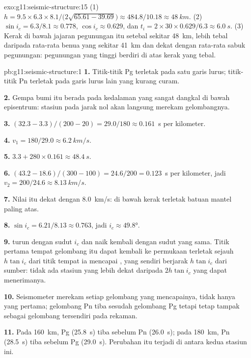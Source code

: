 \begin{solution}{exo:g11:seismic-structure:15}
(1) $h = 9.5 \times 6.3 \times 8.1/\bigl(2\sqrt{65.61 - 39.69}\bigr) \approx
484.8/10.18 \approx \qty{48}{km}$. (2) $\sin i_c = 6.3/8.1 \approx 0.778$,
$\cos i_c \approx 0.629$, dan $t_i = 2 \times 30 \times 0.629/6.3 \approx
\qty{6.0}{s}$. (3) Kerak di bawah jajaran pegunungan itu setebal sekitar
\qty{48}{km}, lebih tebal daripada rata-rata benua yang sekitar \qty{41}{km}
dan dekat dengan rata-rata sabuk pegunungan: pegunungan yang tinggi berdiri di
atas kerak yang tebal.
\end{solution}

\begin{solution}{pb:g11:seismic-structure:1}
\textbf{1.} Titik-titik Pg terletak pada satu garis lurus; titik-titik Pn
terletak pada garis lurus lain yang kurang curam.

\textbf{2.} Gempa bumi itu berada pada kedalaman yang sangat dangkal di bawah
episentrum: stasiun pada jarak nol akan langsung merekam gelombangnya.

\textbf{3.} $(32.3 - 3.3)/(200 - 20) = 29.0/180 \approx \num{0.161}$~\unit{s}
per kilometer.

\textbf{4.} $v_1 = 180/29.0 \approx \qty{6.2}{km/s}$.

\textbf{5.} $3.3 + 280 \times 0.161 \approx \qty{48.4}{s}$.

\textbf{6.} $(43.2 - 18.6)/(300 - 100) = 24.6/200 = \num{0.123}$~\unit{s}
per kilometer, jadi $v_2 = 200/24.6 \approx \qty{8.13}{km/s}$.

\textbf{7.} Nilai itu dekat dengan \qty{8.0}{km/s}: di bawah kerak terletak
batuan mantel paling atas.

\textbf{8.} $\sin i_c = 6.21/8.13 \approx 0.763$, jadi $i_c \approx
\ang{49.8}$.

\textbf{9.}  turun dengan sudut $i_c$ dan naik kembali dengan
sudut yang sama. Titik pertama tempat gelombang itu dapat kembali ke permukaan
terletak sejauh $h\tan i_c$ dari titik tempat ia mencapai , yang sendiri
berjarak $h\tan i_c$ dari sumber: tidak ada stasiun yang lebih dekat daripada
$2h\tan i_c$ yang dapat menerimanya.

\textbf{10.} Seismometer merekam setiap gelombang yang mencapainya, tidak hanya
yang pertama; gelombang Pn tiba sesudah gelombang Pg tetapi tetap tampak
sebagai gelombang tersendiri pada rekaman.

\textbf{11.} Pada \qty{160}{km}, Pg (\qty{25.8}{s}) tiba sebelum Pn
(\qty{26.0}{s}); pada \qty{180}{km}, Pn (\qty{28.5}{s}) tiba sebelum Pg
(\qty{29.0}{s}). Perubahan itu terjadi di antara kedua stasiun ini.


\end{solution}
